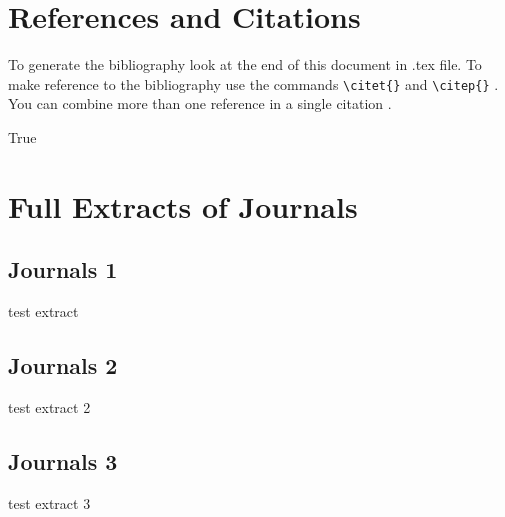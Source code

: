 \documentclass{UoNMCHA}
\numberwithin{equation}{section}
\begin{document}
%
%
%
%
\section{References and Citations}\label{sec:RefCite}
To generate the bibliography look at the end of this document in .tex file. To make reference to the bibliography use the commands \verb|\citet{}| and \verb|\citep{}| \citep{strunk2007elements}. You can combine more than one reference in a single citation \citep{troyka1999simon, jay1995write}.

True \cite{TFwebsite2}
\citet{TFwebsite2}
 


\newpage
\appendix
\section{Full Extracts of Journals}
\subsection{Journals 1}
test extract
\subsection{Journals 2}
test extract 2
\subsection{Journals 3}
test extract 3
\end{document}
